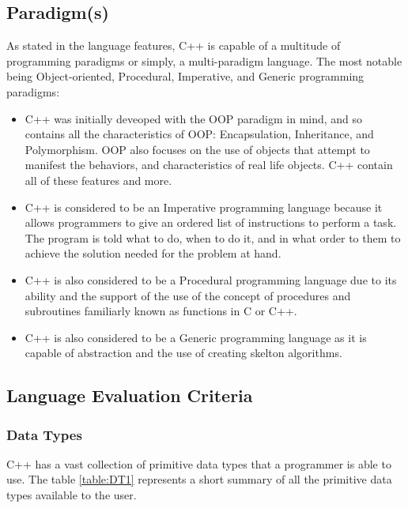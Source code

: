 \documentclass[12pt]{article}
\begin{document}
\subsection{Paradigm(s)}
As stated in the language features, C++ is capable of a multitude of programming paradigms or simply, a multi-paradigm language. The most notable being Object-oriented, Procedural, Imperative, and Generic programming paradigms: 
\begin{itemize}
  \item C++ was initially deveoped with the OOP paradigm in mind, and so contains all the characteristics of OOP: Encapsulation, Inheritance, and Polymorphism. OOP also focuses on the use of objects that attempt to manifest the behaviors, and characteristics of real life objects. C++ contain all of these features and more.
  \item C++ is considered to be an Imperative programming language because it allows programmers to give an ordered list of instructions to perform a task. The program is told what to do, when to do it, and in what order to them to achieve the solution needed for the problem at hand.
  \item C++ is also considered to be a Procedural programming language due to its ability and the support of the use of the concept of procedures and subroutines familiarly known as functions in C or C++.
  \item C++ is also considered to be a Generic programming language as it is capable of abstraction and the use of creating skelton algorithms. 
\end{itemize}

\subsection{Language Evaluation Criteria}

\subsubsection{Data Types}
C++ has a vast collection of primitive data types that a programmer is able to use. The table \ref{table:DT1} represents a short summary of all the primitive data types available to the user.
\end{document}

